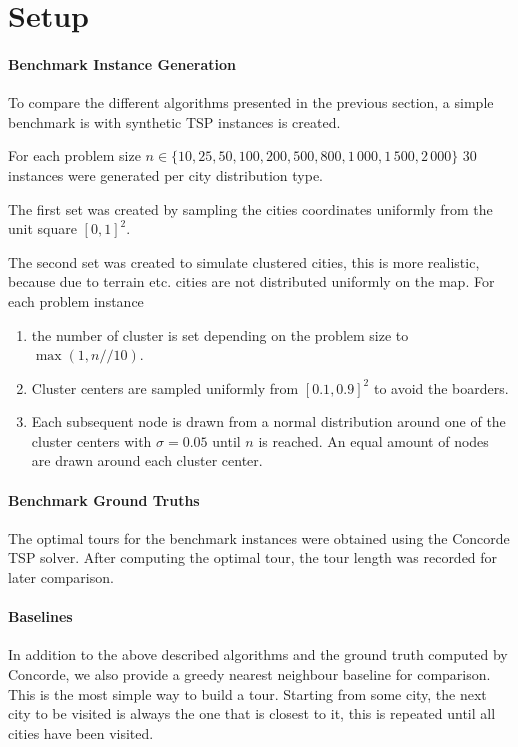 \section{Setup}
\paragraph{Benchmark Instance Generation}
To compare the different algorithms presented in the previous section, a simple benchmark is with synthetic TSP instances is created.

For each problem size \(n \in \{10, 25, 50, 100, 200, 500, 800, 1\,000, 1\,500, 2\,000\}\) 30 instances were generated per city distribution type.

The first set was created by sampling the cities coordinates uniformly from the unit square \([0,1]^2\).

The second set was created to simulate clustered cities, this is more realistic, because due to terrain etc. cities are not distributed uniformly on the map.
For each problem instance
\begin{enumerate}
	\item the number of cluster is set depending on the problem size to \( \max(1, n // 10) \).
	\item Cluster centers are sampled uniformly from \([0.1, 0.9]^2\) to avoid the boarders.
	\item Each subsequent node is drawn from a normal distribution around one of the cluster centers with \( \sigma = 0.05 \) until \( n \) is reached.
	      An equal amount of nodes are drawn around each cluster center.
\end{enumerate}

\paragraph{Benchmark Ground Truths}
The optimal tours for the benchmark instances were obtained using the Concorde TSP solver. After computing the optimal tour, the tour length was recorded for later comparison.

\paragraph{Baselines}
In addition to the above described algorithms and the ground truth computed by Concorde, we also provide a greedy nearest neighbour baseline for comparison.
This is the most simple way to build a tour. Starting from some city, the next city to be visited is always the one that is closest to it, this is repeated until all cities have been visited.



